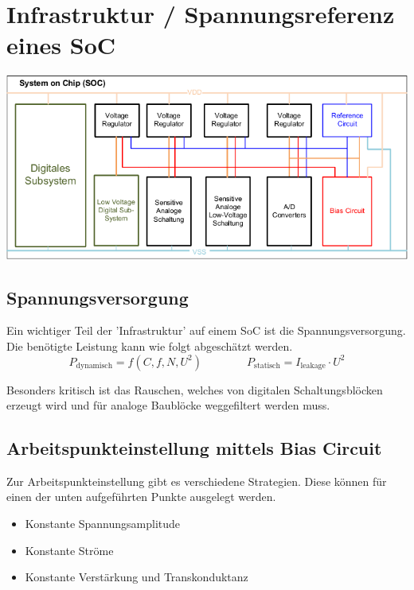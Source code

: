 \section{Infrastruktur / Spannungsreferenz eines SoC}

\begin{center}
    \includegraphics[width=0.8\columnwidth, align=t]{images/13_SoC.pdf}
\end{center}
\vspace{-0.2cm}


\subsection{Spannungsversorgung}
Ein wichtiger Teil der 'Infrastruktur' auf einem SoC ist die Spannungsversorgung. 
Die benötigte Leistung kann wie folgt abgeschätzt werden.
\[
    P_\mathrm{dynamisch} = f(C, f, N, U^2) \qquad \qquad
    P_\mathrm{statisch} = I_\mathrm{leakage} \cdot U^2
\]

Besonders kritisch ist das Rauschen, welches von digitalen Schaltungsblöcken erzeugt wird und für analoge Baublöcke weggefiltert werden muss.


\subsection{Arbeitspunkteinstellung mittels Bias Circuit}
Zur Arbeitspunkteinstellung gibt es verschiedene Strategien.
Diese können für einen der unten aufgeführten Punkte ausgelegt werden.

\smallskip

\begin{minipage}[t]{0.42\columnwidth}
    \begin{itemize}
        \item Konstante Spannungsamplitude
        \item Konstante Ströme
    \end{itemize}
\end{minipage}
\hfill
\begin{minipage}[t]{0.55\columnwidth}
    \begin{itemize}
        \item Konstante Verstärkung und Transkonduktanz
    \end{itemize}
\end{minipage}

